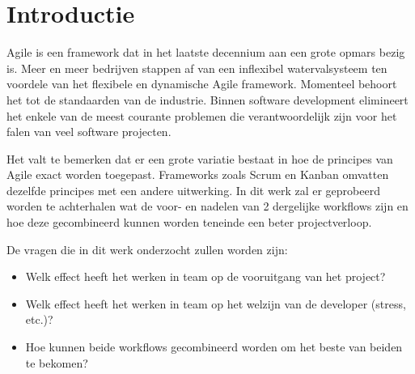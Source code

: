 
\section{Introductie} %
\label{sec:introductie}

%


Agile is een framework dat in het laatste decennium aan een grote opmars bezig is. Meer en meer bedrijven stappen af van een inflexibel watervalsysteem ten voordele van het flexibele en dynamische Agile framework. Momenteel behoort het tot de standaarden van de industrie. Binnen software development elimineert het enkele van de meest courante problemen die verantwoordelijk zijn voor het falen van veel software projecten.

Het valt te bemerken dat er een grote variatie bestaat in hoe de principes van Agile exact worden toegepast. Frameworks zoals Scrum en Kanban omvatten dezelfde principes met een andere uitwerking. In dit werk zal er geprobeerd worden te achterhalen wat de voor- en nadelen van 2 dergelijke workflows zijn en hoe deze gecombineerd kunnen worden teneinde een beter projectverloop.

De vragen die in dit werk onderzocht zullen worden zijn:
\begin{itemize}
\item Welk effect heeft het werken in team op de vooruitgang van het project?
\item Welk effect heeft het werken in team op het welzijn van de developer (stress, etc.)?
\item Hoe kunnen beide workflows gecombineerd worden om het beste van beiden te bekomen?
\end{itemize}

